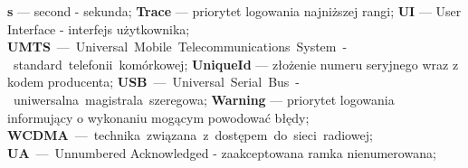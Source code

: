 \textbf{s} --- second - sekunda;\newline
\textbf{Trace} --- priorytet logowania najniższej rangi;\newline
\textbf{UI} --- User Interface - interfejs użytkownika;\newline
\textbf{UMTS} --- Universal Mobile Telecommunications System - standard telefonii komórkowej;\newline
\textbf{UniqueId} --- złożenie numeru seryjnego wraz z kodem producenta;\newline
\textbf{USB} --- Universal Serial Bus - uniwersalna magistrala szeregowa;\newline
\textbf{Warning} --- priorytet logowania informujący o wykonaniu mogącym powodować błędy;\newline
\textbf{WCDMA} --- technika związana z dostępem do sieci radiowej;\newline
\textbf{UA} --- Unnumbered Acknowledged - zaakceptowana ramka nienumerowana;\newline
